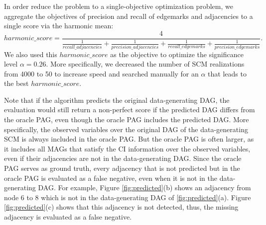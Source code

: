 \documentclass[conference]{IEEEtran}
\begin{document}
In order reduce the problem to a single-objective optimization problem, we aggregate the objectives of precision and recall of edgemarks and adjacencies to a single score via the harmonic mean:
\begin{equation}
harmonic\_score=\frac{4}{\frac{1}{recall\_adjacencies}+\frac{1}{precision\_adjacencies}+\frac{1}{recall\_edgemarks}+\frac{1}{precision\_edgemarks}}.
\label{eq:harmonicscore}
\end{equation}
We also used this $harmonic\_score$ as the objective to optimize the significance level $\alpha=0.26$. More specifically, we decreased the number of SCM realizations from 4000 to 50 to increase speed and searched manually for an $\alpha$ that leads to the best $harmonic\_score$.

Note that if the algorithm predicts the original data-generating DAG, the evaluation would still return a non-perfect score if the predicted DAG differs from the oracle PAG, even though the oracle PAG includes the predicted DAG. More specifically, the observed variables over the original DAG of the data-generating SCM is always included in the oracle PAG. But the oracle PAG is often larger, as it includes all MAGs that satisfy the CI information over the observed variables, even if their adjacencies are not in the data-generating DAG. Since the oracle PAG serves as ground truth, every adjacency that is not predicted but in the oracle PAG is evaluated as a false negative, even when it is not in the data-generating DAG.
For example, Figure \ref{fig:predicted}(b) shows an adjacency from node 6 to 8 which is not in the data-generating DAG of \ref{fig:predicted}(a). Figure \ref{fig:predicted}(c) shows that this adjacency is not detected, thus, the missing adjacency is evaluated as a false negative.
\end{document}
